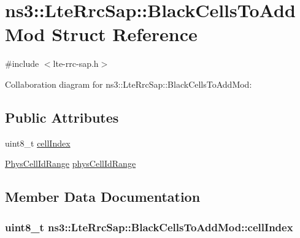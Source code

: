 \hypertarget{structns3_1_1LteRrcSap_1_1BlackCellsToAddMod}{}\section{ns3\+:\+:Lte\+Rrc\+Sap\+:\+:Black\+Cells\+To\+Add\+Mod Struct Reference}
\label{structns3_1_1LteRrcSap_1_1BlackCellsToAddMod}


{\ttfamily \#include $<$lte-\/rrc-\/sap.\+h$>$}



Collaboration diagram for ns3\+:\+:Lte\+Rrc\+Sap\+:\+:Black\+Cells\+To\+Add\+Mod\+:
\subsection*{Public Attributes}
\begin{DoxyCompactItemize}
\item 
uint8\+\_\+t \hyperlink{structns3_1_1LteRrcSap_1_1BlackCellsToAddMod_a345a201ae04baa83e1f4d2a001835ccd}{cell\+Index}
\item 
\hyperlink{structns3_1_1LteRrcSap_1_1PhysCellIdRange}{Phys\+Cell\+Id\+Range} \hyperlink{structns3_1_1LteRrcSap_1_1BlackCellsToAddMod_aea531e9719e3f593411e2166567fe8bc}{phys\+Cell\+Id\+Range}
\end{DoxyCompactItemize}


\subsection{Member Data Documentation}
\subsubsection[{\texorpdfstring{cell\+Index}{cellIndex}}]{\setlength{\rightskip}{0pt plus 5cm}uint8\+\_\+t ns3\+::\+Lte\+Rrc\+Sap\+::\+Black\+Cells\+To\+Add\+Mod\+::cell\+Index}\hypertarget{structns3_1_1LteRrcSap_1_1BlackCellsToAddMod_a345a201ae04baa83e1f4d2a001835ccd}{}\label{structns3_1_1LteRrcSap_1_1BlackCellsToAddMod_a345a201ae04baa83e1f4d2a001835ccd}
